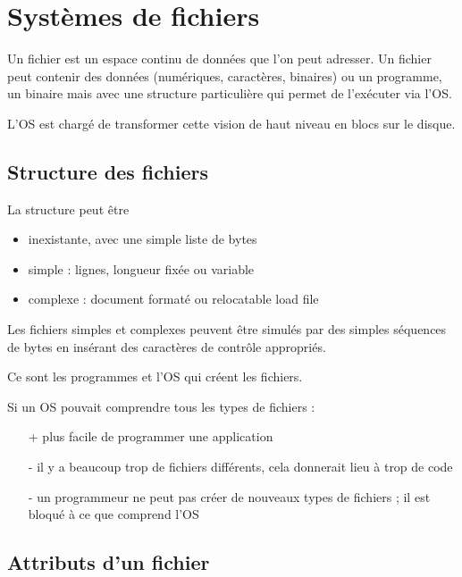\chapter{Systèmes de fichiers}

Un fichier est un espace continu de données que l'on peut adresser.  Un fichier peut contenir des données  (numériques, caractères, binaires) ou un programme, un binaire mais avec une structure particulière qui permet de l'exécuter via l'OS.

L'OS est chargé de transformer cette vision de haut niveau en blocs sur le disque.

\section{Structure des fichiers}

La structure peut être

\begin{itemize}
	\item inexistante, avec une simple liste de bytes
	\item simple : lignes, longueur fixée ou variable
	\item complexe : document formaté ou relocatable load file
\end{itemize}

Les fichiers simples et complexes peuvent être simulés par des simples séquences de bytes en insérant des caractères de contrôle appropriés.

Ce sont les programmes et l'OS qui créent les fichiers.

Si un OS pouvait comprendre tous les types de fichiers :

\begin{itemize}
	\item[+] plus facile de programmer une application
	\item[-] il y a beaucoup trop de fichiers différents, cela donnerait lieu à trop de code
	\item[-] un programmeur ne peut pas créer de nouveaux types de fichiers ; il est bloqué à ce que comprend l'OS
\end{itemize}


\section{Attributs d'un fichier}

